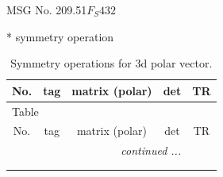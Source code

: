 \documentclass[fleqn,8pt]{jsarticle}
\begin{document}
\setcounter{MaxMatrixCols}{32}

\renewcommand{\tablename}{Table~}
\renewcommand{\figurename}{Figure~}
\begin{center}
\LARGE
MSG No. 209.51\quad$F_{S}432$
\end{center}
* symmetry operation
\renewcommand{\arraystretch}{1.3}
\begin{longtable}{ccccc}
\caption{Symmetry operations for 3d polar vector.}
 \\
 \hline \hline
No. & tag & matrix (polar) & det & TR \\ \hline \endfirsthead

\multicolumn{4}{l}{\tablename\ \thetable{}} \\
 \hline \hline
No. & tag & matrix (polar) & det & TR \\ \hline \endhead

 \hline \hline
\multicolumn{4}{r}{\footnotesize\it continued ...} \\ \endfoot

 \hline \hline
\multicolumn{4}{r}{} \\ \endlastfoot


\end{longtable}
\end{document}

